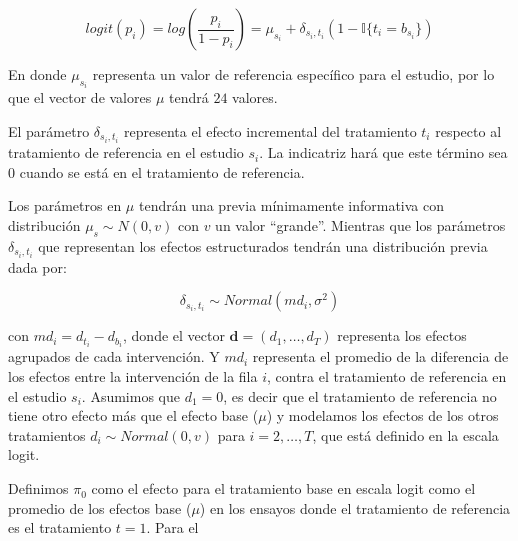 \documentclass[xcolor=dvipsnames]{beamer}
\begin{document}
\begin{equation}
    logit(p_i) = log(\frac{p_i}{1-p_i}) = \mu_{s_i} + \delta_{s_i , t_i}(1-\mathbb{I}\{t_i = b_{s_i}\})
\end{equation}

En donde $\mu_{s_i}$ representa un valor de referencia específico para el estudio, por lo que el vector de valores \textbf{$\mu$} tendrá $24$ valores.\

El parámetro $\delta_{s_i ,t_i}$ representa el efecto incremental del tratamiento $t_i$ respecto al tratamiento de referencia en el estudio $s_i$. La indicatriz hará que este término sea 0 cuando se está en el tratamiento de referencia.

Los parámetros en \textbf{$\mu$} tendrán una previa mínimamente informativa con distribución $\mu_s \sim N(0,v)$ con $v$ un valor ``grande''. Mientras que los parámetros $\delta_{s_i ,t_i}$ que representan los efectos estructurados tendrán una distribución previa dada por:

\begin{equation}
    \delta_{s_i,t_i} \sim Normal(md_i, \sigma^2)
\end{equation}

con $md_i=d_{t_i}-d_{b_i}$, donde el vector $\textbf{d}=(d_1,\dots,d_T)$ representa los efectos agrupados de cada intervención. Y $md_i$ representa el promedio de la diferencia de los efectos entre la intervención de la fila $i$, contra el tratamiento de referencia en el estudio $s_i$.
Asumimos que $d_1=0$, es decir que el tratamiento de referencia no tiene otro efecto más que el efecto base ($\mu$) y modelamos los efectos de los otros tratamientos $d_i \sim Normal(0,v)$ para $i=2,\dots,T$, que está definido en la escala logit.

Definimos $\pi_0$ como el efecto para el tratamiento base en escala logit como el promedio de los efectos base (\textbf{$\mu$}) en los ensayos donde el tratamiento de referencia es el tratamiento $t=1$. Para el 
\end{document}
